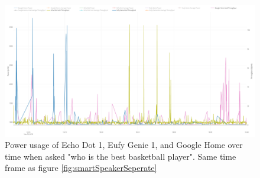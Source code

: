 \begin{figure}[H]
  \centering
  \includegraphics[width=1\textwidth]{figures/smartSpeakerNetworkSeperate.png}
  \caption{Power usage of Echo Dot 1, Eufy Genie 1, and Google Home over time when asked "who is the best basketball player". Same time frame as figure \ref{fig:smartSpeakerSeperate}}
  \label{fig:smartSpeakerNetworkSeperate}
\end{figure}
